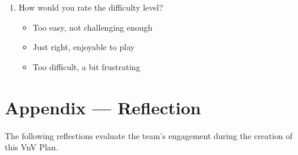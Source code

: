 \documentclass[12pt]{article}
\begin{document}
\begin{enumerate}
    \item How would you rate the difficulty level?
    \begin{itemize}
        \item Too easy, not challenging enough
        \item Just right, enjoyable to play
        \item Too difficult, a bit frustrating
    \end{itemize}
\end{enumerate}


\section*{Appendix --- Reflection}

The following reflections evaluate the team's engagement during the creation of this VnV Plan.
\end{document}
